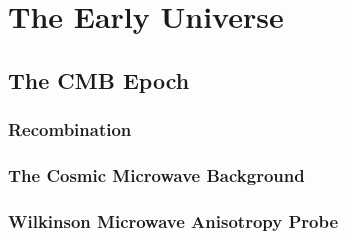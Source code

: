 
%
%

\section{The Early Universe}
\label{sec:early_universe}





\subsection{The CMB Epoch}
\label{subsec:cmb_epoch}



\subsubsection{Recombination}
\label{subsubsec:recombination}



\subsubsection{The Cosmic Microwave Background}
\label{subsubsec:cmb}



\subsubsection{Wilkinson Microwave Anisotropy Probe}
\label{subsubsec:wmap}



